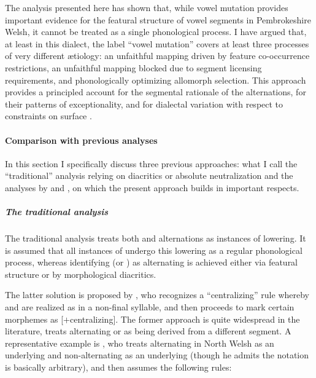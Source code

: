 The analysis presented here has shown that, while vowel mutation provides important evidence for the featural structure of vowel segments in Pembrokeshire Welsh, it cannot be treated as a single phonological process. I have argued that, at least in this dialect, the label \enquote{vowel mutation} covers at least three processes of very different ætiology: an unfaithful mapping driven by feature co\hyp occurrence restrictions, an unfaithful mapping blocked due to segment licensing requirements, and phonologically optimizing allomorph selection. This approach provides a principled account for the segmental rationale of the alternations, for their patterns of exceptionality, and for dialectal variation with respect to constraints on surface \ipa{[ə]}.

\paragraph{Comparison with previous analyses}
\label{sec:comp-with-prev}

In this section I specifically discuss three previous approaches: what I call the \enquote{traditional} analysis relying on diacritics or absolute neutralization and the analyses by \citet{bosch96:_promin} and \citet{hannahs07:_const_welsh}, on which the present approach builds in important respects.

\subparagraph{The traditional analysis}
\label{sec:traditional-analysis}

The traditional analysis treats both \alternation{[ə]}{[i]} and \alternation{[ə]}{[u]} alternations as instances of lowering. It is assumed that all instances of \ipa{[u]} undergo this lowering as a regular phonological process, whereas identifying \ipa{[i]} (or \ipa{[ɨ]}) as alternating is achieved either via featural structure or by morphological diacritics.

The latter solution is proposed by  \citet{awbery86:_pembr_welsh}, who recognizes a \enquote{centralizing} rule whereby \ipa{[u]} and \ipa{[i]} are realized as \ipa{[ə]} in a non-final syllable, and then proceeds to mark certain morphemes as [$+$centralizing]. The former approach is quite widespread in the literature, treats alternating \ipa{[ɨ]} or \ipa{[i]} as being derived from a different segment. A representative example is \citet{thomas84:_north_welsh}, who treats alternating \ipa{[ɨ]} in North Welsh as an underlying  and non-alternating \ipa{[ɨ]} as an underlying \ipa{[ɯ]} (though he admits the notation is basically arbitrary), and then assumes the following rules:

